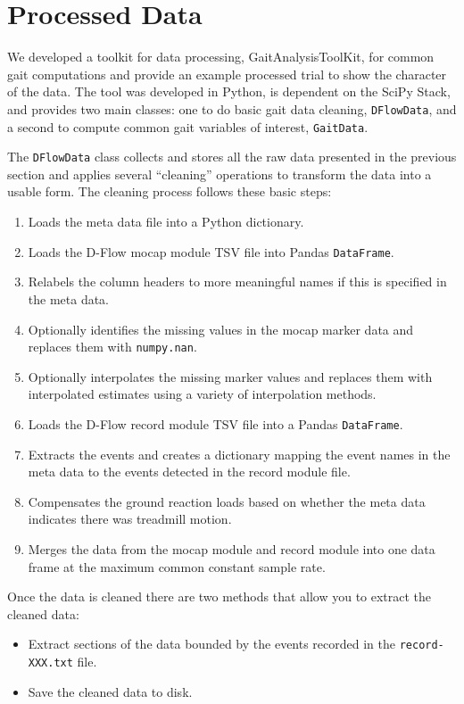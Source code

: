 \documentclass[fleqn,10pt]{wlpeerj}
\begin{document}
\section*{Processed Data}

We developed a toolkit for data processing, GaitAnalysisToolKit, for common
gait computations and provide an example processed trial to show the character
of the data. The tool was developed in Python, is dependent on the SciPy Stack,
and provides two main classes: one to do basic gait data cleaning,
\verb|DFlowData|, and a second to compute common gait variables of interest,
\verb|GaitData|.

The \verb|DFlowData| class collects and stores all the raw data presented in
the previous section and applies several ``cleaning'' operations to transform
the data into a usable form. The cleaning process follows these basic steps:

\begin{enumerate}
  \item Loads the meta data file into a Python dictionary.
  \item Loads the D-Flow mocap module TSV file into Pandas \verb|DataFrame|.
  \item Relabels the column headers to more meaningful names if this is
    specified in the meta data.
  \item Optionally identifies the missing values in the mocap marker data and
    replaces them with \verb|numpy.nan|.
  \item Optionally interpolates the missing marker values and replaces them
    with interpolated estimates using a variety of interpolation methods.
  \item Loads the D-Flow record module TSV file into a Pandas \verb|DataFrame|.
  \item Extracts the events and creates a dictionary mapping the event names in
    the meta data to the events detected in the record module file.
  \item Compensates the ground reaction loads based on whether the meta data
    indicates there was treadmill motion.
  \item Merges the data from the mocap module and record module into one data
    frame at the maximum common constant sample rate.
\end{enumerate}

Once the data is cleaned there are two methods that allow you to extract the
cleaned data:

\begin{itemize}
  \item Extract sections of the data bounded by the events recorded in the
    \verb|record-XXX.txt| file.
  \item Save the cleaned data to disk.
\end{itemize}
\end{document}
